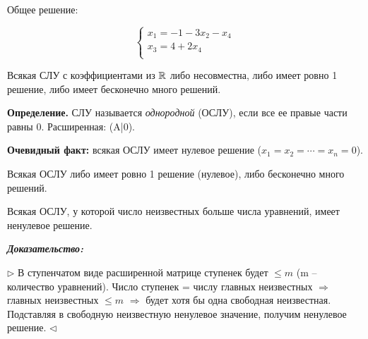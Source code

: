 Общее решение:

\begin{equation*}
	\left\{
		\begin{aligned}
        x_1 = -1 - 3x_2 - x_4\\
        x_3 = 4 + 2x_4 \\
		\end{aligned}
	\right.
\end{equation*}

\begin{corollary}
Всякая СЛУ с коэффициентами из $\mathbb{R}$ либо несовместна, либо имеет ровно 1 решение, либо имеет бесконечно много решений.
\end{corollary}

\textbf{Определение.} СЛУ называется \textit{однородной} (ОСЛУ), если все ее правые части равны 0. Расширенная: (A|0). 

\vspace{\baselineskip}
\textbf{Очевидный факт:} всякая ОСЛУ имеет нулевое решение ($x_1 = x_2 = \cdots= x_n = 0$).

\begin{corollary}
Всякая ОСЛУ либо имеет ровно 1 решение (нулевое), либо бесконечно много решений.
\end{corollary}

\begin{corollary}
Всякая ОСЛУ, у которой число неизвестных больше числа уравнений, имеет ненулевое решение.
\end{corollary}

\textbf{\textit{Доказательство:}} 

$\rhd$ В ступенчатом виде расширенной матрице ступенек будет $\le m$ (m -- количество уравнений). Число ступенек = числу главных неизвестных $\Rightarrow$ главных неизвестных $\le m$ $\Rightarrow$ будет хотя бы одна свободная неизвестная. Подставляя в свободную неизвестную ненулевое значение, получим ненулевое решение. $\lhd$

